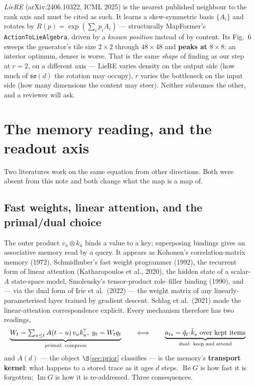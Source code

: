 \documentclass[11pt]{article}
\begin{document}
\emph{LieRE} (arXiv:2406.10322, ICML 2025) is the nearest published neighbour to
the rank axis and must be cited as such. It learns a skew-symmetric basis
$\{A_i\}$ and rotates by $R(p)=\exp(\sum_i p_iA_i)$ --- structurally MapFormer's
\texttt{ActionToLieAlgebra}, driven by a \emph{known position} instead of by
content. Its Fig.~6 sweeps the generator's tile size $2\times2$ through
$48\times48$ and \textbf{peaks at $8\times8$}: an interior optimum, denser is
worse. That is the same \emph{shape} of finding as our step at $r=2$, on a
different axis --- LieRE varies density on the output side (how much of
$\mathfrak{so}(d)$ the rotation may occupy), $r$ varies the bottleneck on the
input side (how many dimensions the content may steer). Neither subsumes the
other, and a reviewer will ask.

\section{The memory reading, and the readout axis}
\label{sec:memory}

Two literatures work on the same equation from other directions. Both were absent
from this note and both change what the map is a map of.

\subsection{Fast weights, linear attention, and the primal/dual choice}

The outer product $v_u\otimes k_u$ binds a value to a key; superposing bindings gives
an associative memory read by a query. It appears as Kohonen's correlation-matrix
memory (1972), Schmidhuber's fast weight programmer (1992), the recurrent form of
linear attention (Katharopoulos et al., 2020), the hidden state of a scalar-$A$
state-space model, Smolensky's tensor-product role--filler binding (1990), and --- via
the dual form of Irie et al.\ (2022) --- the weight matrix of any linearly-parameterised
layer trained by gradient descent. Schlag et al.\ (2021) made the linear-attention
correspondence explicit. Every mechanism therefore has two readings,
\[
  \underbrace{W_t = \textstyle\sum_{u\le t} A(t-u)\,v_uk_u^{\!\top},\; y_t = W_tq_t}_{\text{\emph{primal}: compress}}
  \qquad\Longleftrightarrow\qquad
  \underbrace{a_{ts} = \tilde q_t\!\cdot\!\tilde k_s \text{ over kept items}}_{\text{\emph{dual}: keep and attend}}
\]
and $A(d)$ --- the object $\S$\ref{sec:prior} classifies --- is the memory's
\textbf{transport kernel}: what happens to a stored trace as it ages $d$ steps.
$\operatorname{Re}G$ is how fast it is forgotten; $\operatorname{Im}G$ is how it is
re-addressed. Three consequences.
\end{document}
